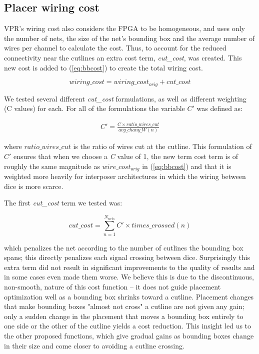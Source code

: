 \documentclass{sig-alternate-2013}
\begin{document}
\subsection{Placer wiring cost}
VPR's wiring cost also considers the FPGA to be homogeneous, and uses only the number of nets, the size of the net's bounding box and the average number of wires per channel to calculate the cost. Thus, to account for the reduced connectivity near the cutlines an extra cost term, \textit{cut\_cost}, was created. This new cost is added to (\ref{eq:bbcost}) to create the total wiring cost.

\begin{equation} \label{eq:total_wiring}
wiring\_cost = wiring\_cost_{orig} + cut\_cost
\end{equation}

We tested several different \textit{cut\_cost} formulations, as well as different weighting (C values) for each. For all of the formulations the variable $C'$ was defined as:

\begin{equation} \label{eq:cprime}
\begin{split}
C' = \frac{C \times ratio\_wires\_cut}{avg\_chany\_W(n)}
\end{split}
\end{equation}

where $ratio\_wires\_cut$ is the ratio of wires cut at the cutline. This formulation of $C'$ ensures that when we choose a \textit{C} value of 1, the new term cost term is of roughly the same magnitude as $wire\_cost_{orig}$ in (\ref{eq:bbcost}) and that it is weighted more heavily for interposer architectures in which the wiring between dice is more scarce.

The first \textit{cut\_cost} term we tested was:

\begin{equation} \label{eq:cost0}
cut\_cost = \sum_{n=1}^{N_{nets}} C' \times times\_crossed(n)
\end{equation}

which penalizes the net according to the number of cutlines the bounding box spans; this directly penalizes each signal crossing between dice. Surprisingly this extra term did not result in significant improvements to the quality of results and in some cases even made them worse. We believe this is due to the discontinuous, non-smooth, nature of this cost function -- it does not guide placement optimization well as a bounding box shrinks toward a cutline. Placement changes that make bounding boxes "almost not cross" a cutline are not given any gain; only a sudden change in the placement that moves a bounding box entirely to one side or the other of the cutline yields a cost reduction. This insight led us to the other proposed functions, which give gradual gains as bounding boxes change in their size and come closer to avoiding a cutline crossing.
\end{document}
